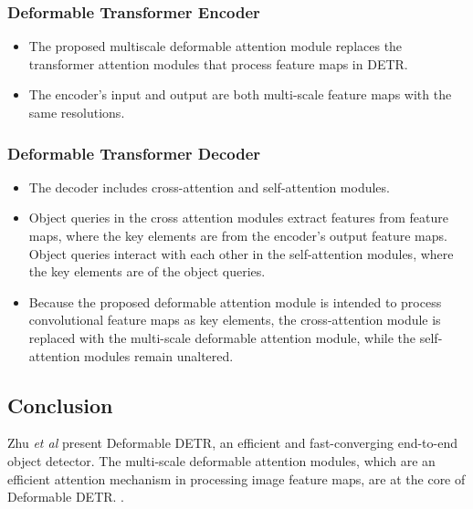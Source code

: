 \subsubsection{Deformable Transformer Encoder}
\begin{itemize}
	\item The proposed multiscale deformable attention module replaces the transformer attention modules that process feature maps in DETR.
	\item The encoder's input and output are both multi-scale feature maps with the same resolutions.
\end{itemize}	


\subsubsection{Deformable Transformer Decoder}

\begin{itemize}
	\item The decoder includes cross-attention and self-attention modules.
	\item Object queries in the cross attention modules extract features from feature maps, where the key elements are from the encoder's output feature maps. Object queries interact with each other in the self-attention modules, where the key elements are of the object queries.
	\item Because the proposed deformable attention module is intended to process convolutional feature maps as key elements, the cross-attention module is replaced with the multi-scale deformable attention module, while the self-attention modules remain unaltered.
\end{itemize}
\subsection{Conclusion}
\par Zhu \textit{et al} present Deformable DETR, an efficient and fast-converging end-to-end object detector.  The multi-scale deformable attention modules, which are an efficient attention mechanism in processing image feature maps, are at the core of Deformable DETR.
.